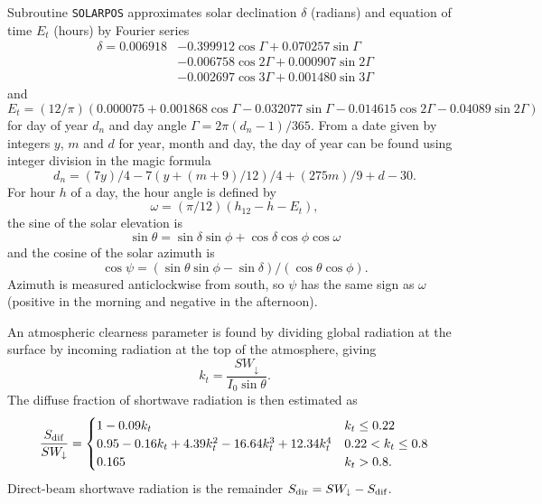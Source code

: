 \documentclass[fleqn]{article}
\begin{document}
Subroutine {\tt SOLARPOS} approximates solar declination $\delta$ (radians) and equation of time $E_t$ (hours) by Fourier series
\begin{align}
\delta = 0.006918 &- 0.399912\cos\Gamma  + 0.070257\sin\Gamma  \nonumber \\
                  &- 0.006758\cos2\Gamma + 0.000907\sin2\Gamma \nonumber \\
                  &- 0.002697\cos3\Gamma + 0.001480\sin3\Gamma
\end{align}
and
\begin{equation}
E_t = (12/\pi)(0.000075 + 0.001868\cos\Gamma  - 0.032077\sin\Gamma 
                        - 0.014615\cos2\Gamma - 0.04089\sin2\Gamma)
\end{equation}
for day of year $d_n$ and day angle $\Gamma = 2\pi(d_n - 1)/365$. From a date given by integers $y$, $m$ and $d$ for year, month and day, the day of year can be found using integer division in the magic formula
\begin{equation}
d_n = (7y)/4 - 7(y+(m+9)/12)/4 + (275m)/9 + d - 30.
\end{equation}
For hour $h$ of a day, the hour angle is defined by
\begin{equation}
\omega = (\pi/12)(h_{12} - h - E_t),
\end{equation}
the sine of the solar elevation is
\begin{equation}
\sin\theta = \sin\delta\sin\phi + \cos\delta\cos\phi\cos\omega
\end{equation}
and the cosine of the solar azimuth is
\begin{equation}
\cos\psi = (\sin\theta\sin\phi - \sin\delta)/(\cos\theta\cos\phi).
\end{equation}
Azimuth is measured anticlockwise from south, so $\psi$ has the same sign as $\omega$ (positive in the morning and negative in the afternoon).

An atmospheric clearness parameter is found by dividing global radiation at the surface by incoming radiation at the top of the atmosphere, giving
\begin{equation}
k_t = \frac{SW_\downarrow}{I_0\sin\theta}.
\end{equation}
The diffuse fraction of shortwave radiation is then estimated as
\begin{equation}
\frac{S_{\rm dif}}{SW_\downarrow} = \begin{cases}
    1 - 0.09k_t &  k_t \leq 0.22  \\
    0.95-0.16k_t+4.39k_t^2-16.64k_t^3+12.34k_t^4 &  0.22 < k_t \leq 0.8  \\
    0.165 &  k_t>0.8.
\end{cases}
\end{equation}
Direct-beam shortwave radiation is the remainder $S_{\rm dir} = SW_\downarrow - S_{\rm dif}$.
\end{document}
